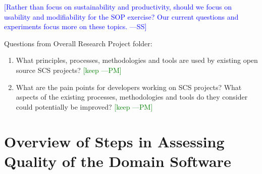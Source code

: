 \documentclass[letterpaper,cleveref]{lipics-v2019}
\newcommand{\authornote}[3]{\textcolor{#1}{[#3 ---#2]}}
\newcommand{\authornote}[3]{}
\newcommand{\wss}[1]{\authornote{blue}{SS}{#1}} %
\newcommand{\pmi}[1]{\authornote{green}{PM}{#1}} %
\theoremstyle{definition}
\begin{document}
\wss{Rather than focus on sustainability and productivity, should we focus on
  usability and modifiability for the SOP exercise?  Our current questions and
  experiments focus more on these topics.}

Questions from Overall Research Project folder:

\begin{enumerate}
\item What principles, processes, methodologies and tools are used by existing
  open source SCS projects? \pmi{keep}
\item What are the pain points for developers working on SCS projects?  What
  aspects of the existing processes, methodologies and tools do they consider
  could potentially be improved? \pmi{keep}
\end{enumerate}

%
%
%
%
%

\section{Overview of Steps in Assessing Quality of the Domain Software}\label{StepsAQDS}
\end{document}

